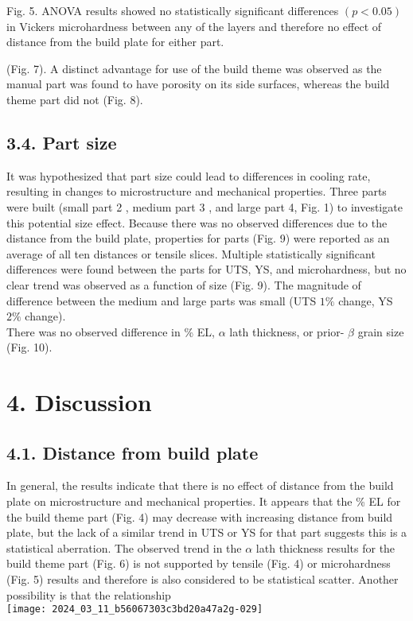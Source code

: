 \documentclass[10pt]{article}
\begin{document}
Fig. 5. ANOVA results showed no statistically significant differences $(p<0.05)$ in Vickers microhardness between any of the layers and therefore no effect of distance from the build plate for either part.

(Fig. 7). A distinct advantage for use of the build theme was observed as the manual part was found to have porosity on its side surfaces, whereas the build theme part did not (Fig. 8).

\subsection*{3.4. Part size}
It was hypothesized that part size could lead to differences in cooling rate, resulting in changes to microstructure and mechanical properties. Three parts were built (small part 2 , medium part 3 , and large part 4, Fig. 1) to investigate this potential size effect. Because there was no observed differences due to the distance from the build plate, properties for parts (Fig. 9) were reported as an average of all ten distances or tensile slices. Multiple statistically significant differences were found between the parts for UTS, YS, and microhardness, but no clear trend was observed as a function of size (Fig. 9). The magnitude of difference between the medium and large parts was small (UTS $1 \%$ change, YS $2 \%$ change).\\
There was no observed difference in \% EL, $\alpha$ lath thickness, or prior- $\beta$ grain size (Fig. 10).

\section*{4. Discussion}
\subsection*{4.1. Distance from build plate}
In general, the results indicate that there is no effect of distance from the build plate on microstructure and mechanical properties. It appears that the \% EL for the build theme part (Fig. 4) may decrease with increasing distance from build plate, but the lack of a similar trend in UTS or YS for that part suggests this is a statistical aberration. The observed trend in the $\alpha$ lath thickness results for the build theme part (Fig. 6) is not supported by tensile (Fig. 4) or microhardness (Fig. 5) results and therefore is also considered to be statistical scatter. Another possibility is that the relationship\\
\texttt{[image: 2024\_03\_11\_b56067303c3bd20a47a2g-029]}
\end{document}
